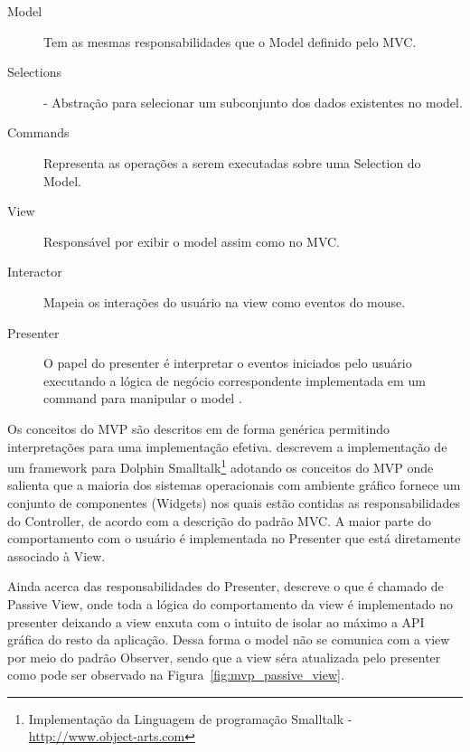 \begin{description}
  \item[Model] Tem as mesmas responsabilidades que o Model definido pelo MVC.
  \item[Selections] - Abstração para selecionar um subconjunto dos dados
  existentes no model.
  \item [Commands] Representa as operações a serem executadas sobre uma
  Selection do Model.
  \item [View] Responsável por exibir o model assim como no MVC.
  \item [Interactor] Mapeia os interações do usuário na view como eventos do
  mouse.
  \item [Presenter] O papel do presenter é interpretar o eventos iniciados pelo
  usuário executando a lógica de negócio correspondente implementada em um
  command para manipular o model \cite{Potel96mvp}.
\end{description}


Os conceitos do MVP são descritos em  de forma genérica
permitindo interpretações para uma implementação efetiva.
 descrevem a implementação de um framework para
Dolphin Smalltalk\footnote{Implementação da Linguagem de programação Smalltalk - 
\url{http://www.object-arts.com}} adotando os conceitos do MVP onde salienta que
a maioria dos sistemas operacionais com ambiente gráfico fornece um conjunto de
componentes (Widgets) nos quais estão contidas as responsabilidades do
Controller, de acordo com a descrição do padrão MVC. A maior parte do
comportamento com o usuário é implementada no Presenter que está
diretamente associado à View.

Ainda acerca das responsabilidades do Presenter,  descreve
o que é chamado de Passive View, onde toda a lógica do comportamento da view é
implementado no presenter deixando a view enxuta com o intuito de isolar ao
máximo a API gráfica do resto da aplicação. Dessa forma o model não se comunica
com a view por meio do padrão Observer, sendo que a view séra atualizada
pelo presenter como pode ser observado na Figura~\ref{fig:mvp_passive_view}.

